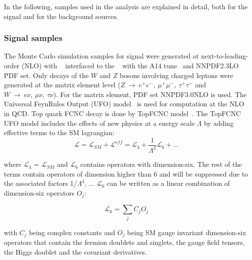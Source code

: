 In the following, samples used in the analysis are explained in detail, both for the signal and for the background sources.

\subsubsection{Signal samples}
\label{sec:samples:mc:sig}

The Monte Carlo simulation samples for signal were generated at next-to-leading-order (NLO) with \aMCatNLO~\cite{Alwall:2014hca} interfaced to the \PythiaEight~\cite{Sjostrand:2007gs} with the \textsc{A14} tune~\cite{Skands:2010ak} and \textsc{NNPDF2.3LO} PDF set. Only decays of the $W$ and $Z$ bosons involving charged leptons were generated at the matrix element level ($Z~\to~e^+e^-,~\mu^+\mu^-,~\tau^+\tau^-$ and $W~\to~e\nu,~\mu\nu,~\tau\nu$). For the matrix element, PDF set \textsc{NNPDF3.0NLO} is used. The Universal FeynRules Output (UFO) model~\cite{Alloul:2013bka} is used for computation at the NLO in QCD. Top quark FCNC decay is done by TopFCNC model~\cite{Degrande:2014tta,Durieux:2014xla}.
The TopFCNC UFO model includes the effects of new physics at a energy scale $\Lambda$ by adding effective terms to the SM lagrangian:
\begin{equation}
\mathcal{L} = \mathcal{L}_{SM} + \mathcal{L}^{eff} = \mathcal{L}_4 + \frac{1}{\Lambda^2} \mathcal{L}_6+ ...
\end{equation}

where $\mathcal{L}_4$ = $\mathcal{L}_{SM}$ and $\mathcal{L}_6$ contains operators with dimension-six. The rest of the terms contain operators of dimension higher than 6 and will be suppressed due to the associated factors 1/$\Lambda^4$, ... $\mathcal{L}_6$ can be written as a linear combination of dimension-six operators $O_j$: 

\begin{equation}
\mathcal{L}_6 = \sum_j C_j O_j
\end{equation}

with $C_j$ being complex constants and $O_j$ being SM gauge invariant dimension-six operators that contain the fermion doublets and singlets, the gauge field tensors, the Higgs doublet and the covariant derivatives.

